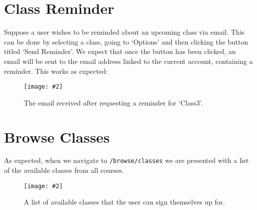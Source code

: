 \documentclass{article}
\newcommand{\screen}[3]{
    \begin{figure}[h]
    \centering
    \texttt{[image: \#2]}
    \caption{#3}
    \end{figure}
}
\begin{document}
\section{Class Reminder}
Suppose a user wishes to be reminded about an upcoming class via email.
This can be done by selecting a class, going to `Options' and then clicking the button titled `Send Reminder'.
We expect that once the button has been clicked, an email will be sent to the email address linked to the current account, containing a reminder.
This works as expected:
\screen{1}{email}{The email received after requesting a reminder for `Class3'.}

\section{Browse Classes}
As expected, when we navigate to \texttt{/browse/classes} we are presented with a list of the available classes from all courses.
\screen{1}{classes}{A list of available classes that the user can sign themselves up for.}
\end{document}
